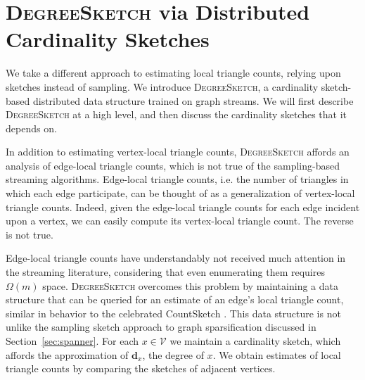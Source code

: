 \documentclass{report}
\newcommand{\algoname}[1]{\textnormal{\textsc{#1}}}
\begin{document}

\section{\algoname{DegreeSketch} via Distributed Cardinality Sketches}
 \label{DS:sec:DS}

We take a different approach to estimating local triangle counts, relying upon sketches instead of sampling.
We introduce \algoname{DegreeSketch}, a cardinality sketch-based distributed data structure trained on graph streams.
We will first describe \algoname{DegreeSketch} at a high level, and then discuss the cardinality sketches that it depends on.

In addition to estimating vertex-local triangle counts, \algoname{DegreeSketch} affords an analysis of edge-local triangle counts, which is not true of the sampling-based streaming algorithms. 
Edge-local triangle counts, i.e. the number of triangles in which each edge participate, can be thought of as a generalization of vertex-local triangle counts. 
Indeed, given the edge-local triangle counts for each edge incident upon a vertex, we can easily compute its vertex-local triangle count.
The reverse is not true. 

Edge-local triangle counts have understandably not received much attention in the streaming literature, considering that even enumerating them requires $\Omega(m)$ space. 
\algoname{DegreeSketch} overcomes this problem by maintaining a data structure that can be queried for an estimate of an edge's local triangle count, similar in behavior to the celebrated CountSketch \cite{charikar2002finding}.
This data structure is not unlike the sampling sketch approach to graph sparsification discussed in Section~\ref{sec:spanner}.
For each $x \in \mathcal{V}$ we maintain a cardinality sketch, which affords the approximation of $\mathbf{d}_x$, the degree of $x$. 
We obtain estimates of local triangle counts by comparing the sketches of adjacent vertices.
\end{document}
